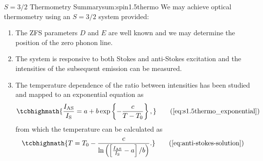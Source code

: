 

\begin{summary}{$S=3/2$ Thermometry Summary}{sum:spin1.5thermo}
	We may achieve optical thermometry using an $S = 3/2$ system provided:
	\begin{enumerate}
		\item The ZFS parameters $D$ and $E$ are well known and we may determine the position of the zero phonon line.
		\item The system is responsive to both Stokes and anti-Stokes excitation and the intensities of the subsequent emission can be measured.
		\item The temperature dependence of the ratio between intensities has been studied and mapped to an exponential equation as             \begin{equation}
			      \tcbhighmath{
				      \frac{I_{\ce{AS}}}{I_{\ce{S}}} = a +  b\exp\left\{-\frac{c}{T - T_0} \right\},
			      }
			      \tag{\ref{eq:s1.5thermo_exponential}}
		      \end{equation}
		      from which the temperature can be calculated as
            \begin{equation}
			      \tcbhighmath{
				      T = T_0 - \frac{c}{\ln\left(\left[{\frac{I_{\ce{AS}}}{I_{\ce{S}}} - a}\right]/b\right)}.
			      }
			      \tag{\ref{eq:anti-stokes-solution}}
		      \end{equation}


	\end{enumerate}
\end{summary}

